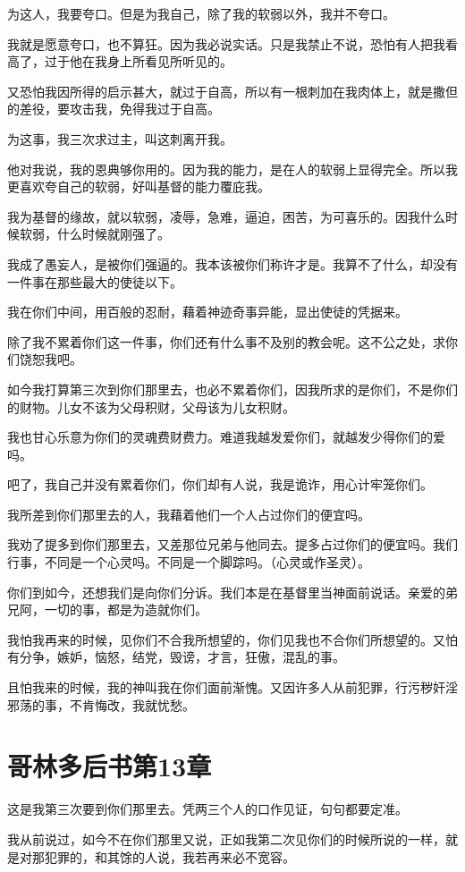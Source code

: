 \documentclass[12pt,oneside]{book}
\begin{document}
为这人，我要夸口。但是为我自己，除了我的软弱以外，我并不夸口。

我就是愿意夸口，也不算狂。因为我必说实话。只是我禁止不说，恐怕有人把我看高了，过于他在我身上所看见所听见的。

又恐怕我因所得的启示甚大，就过于自高，所以有一根刺加在我肉体上，就是撒但的差役，要攻击我，免得我过于自高。

为这事，我三次求过主，叫这刺离开我。

他对我说，我的恩典够你用的。因为我的能力，是在人的软弱上显得完全。所以我更喜欢夸自己的软弱，好叫基督的能力覆庇我。

我为基督的缘故，就以软弱，凌辱，急难，逼迫，困苦，为可喜乐的。因我什么时候软弱，什么时候就刚强了。

我成了愚妄人，是被你们强逼的。我本该被你们称许才是。我算不了什么，却没有一件事在那些最大的使徒以下。

我在你们中间，用百般的忍耐，藉着神迹奇事异能，显出使徒的凭据来。

除了我不累着你们这一件事，你们还有什么事不及别的教会呢。这不公之处，求你们饶恕我吧。

如今我打算第三次到你们那里去，也必不累着你们，因我所求的是你们，不是你们的财物。儿女不该为父母积财，父母该为儿女积财。

我也甘心乐意为你们的灵魂费财费力。难道我越发爱你们，就越发少得你们的爱吗。

吧了，我自己并没有累着你们，你们却有人说，我是诡诈，用心计牢笼你们。

我所差到你们那里去的人，我藉着他们一个人占过你们的便宜吗。

我劝了提多到你们那里去，又差那位兄弟与他同去。提多占过你们的便宜吗。我们行事，不同是一个心灵吗。不同是一个脚踪吗。（心灵或作圣灵）。

你们到如今，还想我们是向你们分诉。我们本是在基督里当神面前说话。亲爱的弟兄阿，一切的事，都是为造就你们。

我怕我再来的时候，见你们不合我所想望的，你们见我也不合你们所想望的。又怕有分争，嫉妒，恼怒，结党，毁谤，才言，狂傲，混乱的事。

且怕我来的时候，我的神叫我在你们面前渐愧。又因许多人从前犯罪，行污秽奸淫邪荡的事，不肯悔改，我就忧愁。

\chapter{哥林多后书第13章}
这是我第三次要到你们那里去。凭两三个人的口作见证，句句都要定准。

我从前说过，如今不在你们那里又说，正如我第二次见你们的时候所说的一样，就是对那犯罪的，和其馀的人说，我若再来必不宽容。
\end{document}
